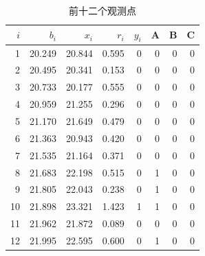 \begin{table}[htbp]\centering\small
\caption{前十二个观测点}\label{tab:sample}
\begin{tabular}{rrrrrrrr}\toprule
$i$ & $b_i$ & $x_i$ & $r_i$ & $y_i$ & A & B & C\\\midrule
1 & 20.249 & 20.844 & 0.595 & 0 & 0 & 0 & 0\\
2 & 20.495 & 20.341 & 0.153 & 0 & 0 & 0 & 0\\
3 & 20.733 & 20.177 & 0.555 & 0 & 0 & 0 & 0\\
4 & 20.959 & 21.255 & 0.296 & 0 & 0 & 0 & 0\\
5 & 21.170 & 21.649 & 0.479 & 0 & 0 & 0 & 0\\
6 & 21.363 & 20.943 & 0.420 & 0 & 0 & 0 & 0\\
7 & 21.535 & 21.164 & 0.371 & 0 & 0 & 0 & 0\\
8 & 21.683 & 22.198 & 0.515 & 0 & 1 & 0 & 0\\
9 & 21.805 & 22.043 & 0.238 & 0 & 1 & 0 & 0\\
10 & 21.898 & 23.321 & 1.423 & 1 & 1 & 0 & 0\\
11 & 21.962 & 21.872 & 0.089 & 0 & 0 & 0 & 0\\
12 & 21.995 & 22.595 & 0.600 & 0 & 1 & 0 & 0\\
\bottomrule\end{tabular}\end{table}